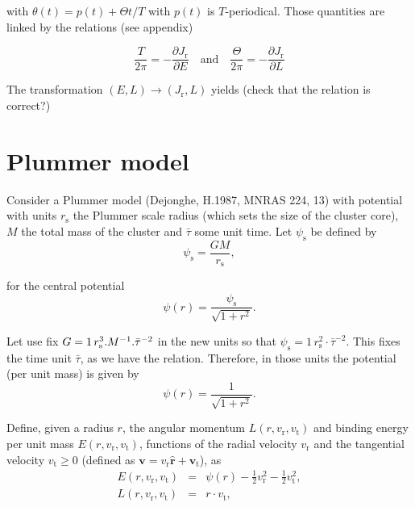 \documentclass[11pt]{article}
\newcommand{\rs}{\mathrm{s}}
\newcommand{\rt}{\mathrm{t}}
\newcommand{\rr}{\mathrm{r}}
\newcommand{\psis}{\psi_{\rs}}
\newcommand{\vr}{v_{\rr}}
\newcommand{\vt}{v_{\rt}}
\newcommand{\bv}{\boldsymbol{v}}
\newcommand{\bvt}{\boldsymbol{v}_{\mathrm{t}}}
\newcommand{\br}{\boldsymbol{r}}
\newcommand{\hr}{\hat{\br}}
\newcommand{\Jr}{J_{\mathrm{r}}}
\begin{document}
with $\theta(t) = p(t) + \Theta t/T$ with $p(t)$ is $T$-periodical.
Those quantities are linked by the relations  (see appendix)

\begin{equation}
  \frac{T}{2\pi} = -\frac{\partial \Jr}{\partial E}\quad \mathrm{and} \quad
  \frac{\Theta}{2\pi} = -\frac{\partial \Jr}{\partial L}
  \label{eq:dJr}
\end{equation}

The transformation $(E,L) \rightarrow (\Jr,L)$ yields (check that the relation is correct?)

\section{Plummer model}
\label{sec:Plummer}

  Consider a Plummer model (Dejonghe, H.1987, MNRAS 224, 13) with potential
with units $r_{\rs}$ the Plummer scale radius (which sets the size
of the cluster core), $M$ the total mass of the cluster and $\bar{\tau}$
some unit time. Let $\psis$ be defined by
\begin{equation}
\psis = \frac{G M}{r_{\rs}} ,
\label{eq:def_psi_s}
\end{equation}

for the central potential
\begin{equation}
\psi(r)=\frac{\psis}{\sqrt{1+r^{2}}} .
\label{eq:def_potential}
\end{equation}

Let use fix $G=1\,r_{\rs}^{3}.M^{-1}.{\rm \bar{\tau}^{-2}}$ in the
new units so that $\psis=1\,r_{\rs}^{2}\cdot\bar{\tau}^{-2}$. This
fixes the time unit $\bar{\tau}$, as we have the relation. Therefore, in
those units the potential (per unit mass) is given by
\begin{equation}
\psi(r)=\frac{1}{\sqrt{1+r^{2}}} .
\label{eq:def_potential_new_units}
\end{equation}

Define, given a radius $r$, the angular momentum $L(r,\vr,\vt)$
and binding energy per unit mass $E(r,\vr,\vt)$, functions of
the radial velocity $\vr$ and the tangential velocity $\vt\geq 0$
(defined as $\bv=\vr \hr + \bvt$),
as
\begin{equation}
\begin{array}{ccl}
E(r,\vr,\vt) & = & \psi(r)-\frac{1}{2} \vr^{2}-\frac{1}{2}\vt^{2} ,\\
L(r,\vr,\vt) & = & r \cdot \vt ,
\end{array}
\label{eq:v_to_E_L}
\end{equation}
\end{document}
